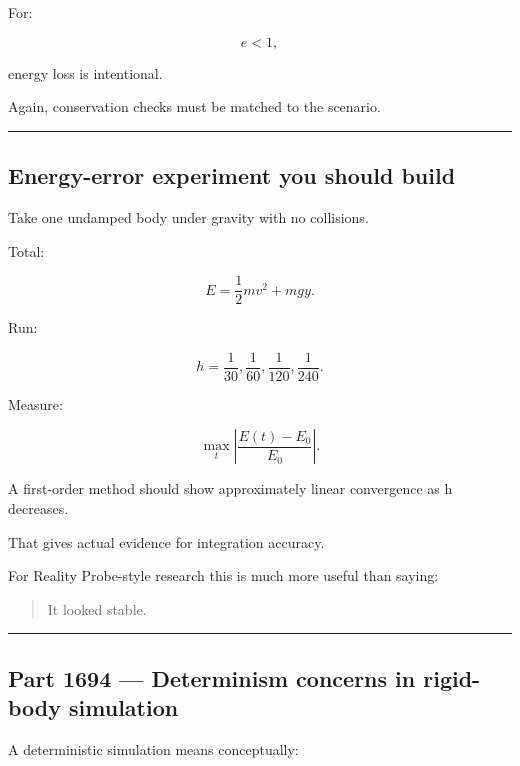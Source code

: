 For:

\[
e<1,
\]

energy loss is intentional.

Again, conservation checks must be matched to the scenario.

\begin{center}\rule{0.5\linewidth}{0.5pt}\end{center}

\subsection{Energy-error experiment you should build}\label{06-engine-ii-ch039-energy-error-experiment-you-should-build}

\hypertarget{06-engine-ii-ch039-energy-error-experiment-you-should-build}{}

Take one undamped body under gravity with no collisions.

Total:

\[
E
=
\frac12mv^2+
mgy.
\]

Run:

\[
h=\frac1{30},
\frac1{60},
\frac1{120},
\frac1{240}.
\]

Measure:

\[
\max_t
\left|
\frac{E(t)-E_0}{E_0}
\right|.
\]

A first-order method should show approximately linear convergence as h decreases.

That gives actual evidence for integration accuracy.

For Reality Probe-style research this is much more useful than saying:

\begin{quote}
It looked stable.
\end{quote}

\begin{center}\rule{0.5\linewidth}{0.5pt}\end{center}

\subsection{Part 1694 --- Determinism concerns in rigid-body simulation}\label{06-engine-ii-ch039-part-1694-determinism-concerns-in-rigid-body-simulation}

\hypertarget{06-engine-ii-ch039-part-1694-determinism-concerns-in-rigid-body-simulation}{}

A deterministic simulation means conceptually:

